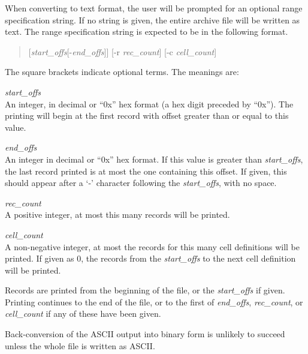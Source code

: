 When converting to text format, the user will be prompted for an
optional range specification string.  If no string is given, the
entire archive file will be written as text.  The range specification
string is expected to be in the following format.

\begin{quote}
    [{\it start\_offs\/}[{\vt -}{\it end\_offs\/}]] [{\vt -r}
      {\it rec\_count\/}] [{\vt -c} {\it cell\_count\/}]
\end{quote}

    The square brackets indicate optional terms.  The meanings are:

\begin{description}
\item{\it start\_offs}\\
An integer, in decimal or ``{\vt 0x}'' hex format (a hex digit
preceded by ``{\vt 0x}'').  The printing will begin at the first
record with offset greater than or equal to this value.

\item{\it end\_offs}\\
An integer in decimal or ``{\vt 0x}'' hex format.  If this value is
greater than {\it start\_offs}, the last record printed is at most the
one containing this offset.  If given, this should appear after a `{\vt -}'
character following the {\it start\_offs}, with no space.

\item{\it rec\_count}\\
A positive integer, at most this many records will be printed.

\item{\it cell\_count}\\
A non-negative integer, at most the records for this many cell
definitions will be printed.  If given as 0, the records from the {\it
start\_offs} to the next cell definition will be printed.
\end{description}

Records are printed from the beginning of the file, or the {\it
start\_offs} if given.  Printing continues to the end of the file, or
to the first of {\it end\_offs}, {\it rec\_count}, or {\it
cell\_count} if any of these have been given.

Back-conversion of the ASCII output into binary form is unlikely
to succeed unless the whole file is written as ASCII.


